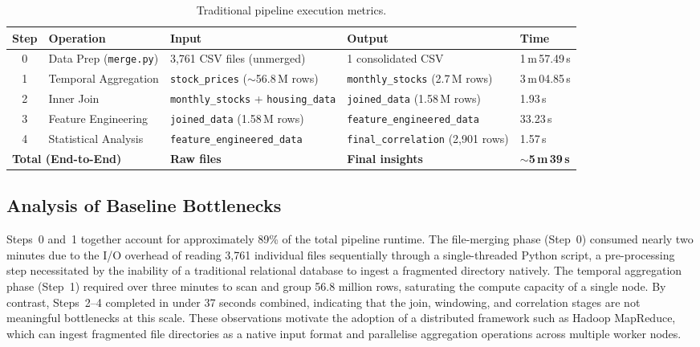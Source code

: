 \documentclass[11pt]{article}
\begin{document}
\begin{table}[h]
\centering
\caption{Traditional pipeline execution metrics.}
\label{tab:baseline}
\renewcommand{\arraystretch}{1.15}
\small
\begin{tabularx}{\textwidth}{c l X X l}
\toprule
\textbf{Step} & \textbf{Operation} & \textbf{Input} & \textbf{Output} & \textbf{Time} \\
\midrule
0 & Data Prep (\texttt{merge.py}) & 3,761 CSV files (unmerged) & 1 consolidated CSV & 1\,m\,57.49\,s \\
1 & Temporal Aggregation & \texttt{stock\_prices} ($\sim$56.8\,M rows) & \texttt{monthly\_stocks} (2.7\,M rows) & 3\,m\,04.85\,s \\
2 & Inner Join & \texttt{monthly\_stocks} + \texttt{housing\_data} & \texttt{joined\_data} (1.58\,M rows) & 1.93\,s \\
3 & Feature Engineering & \texttt{joined\_data} (1.58\,M rows) & \texttt{feature\_engineered\_data} & 33.23\,s \\
4 & Statistical Analysis & \texttt{feature\_engineered\_data} & \texttt{final\_correlation} (2,901 rows) & 1.57\,s \\
\midrule
\multicolumn{2}{l}{\textbf{Total (End-to-End)}} & \textbf{Raw files} & \textbf{Final insights} & \textbf{$\sim$5\,m\,39\,s} \\
\bottomrule
\end{tabularx}
\end{table}

\subsection{Analysis of Baseline Bottlenecks}

Steps~0 and~1 together account for approximately 89\% of the total pipeline runtime. The file-merging phase (Step~0) consumed nearly two minutes due to the I/O overhead of reading 3,761 individual files sequentially through a single-threaded Python script, a pre-processing step necessitated by the inability of a traditional relational database to ingest a fragmented directory natively. The temporal aggregation phase (Step~1) required over three minutes to scan and group 56.8 million rows, saturating the compute capacity of a single node. By contrast, Steps~2--4 completed in under 37 seconds combined, indicating that the join, windowing, and correlation stages are not meaningful bottlenecks at this scale. These observations motivate the adoption of a distributed framework such as Hadoop MapReduce, which can ingest fragmented file directories as a native input format and parallelise aggregation operations across multiple worker nodes.
\end{document}
